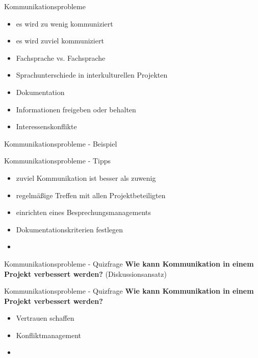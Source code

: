 \documentclass[12pt]{beamer}
\begin{document}
	\begin{frame}{Kommunikationsprobleme}
		\begin{itemize}
			\item{es wird zu wenig kommuniziert}
			\item{es wird zuviel kommuniziert}
			\item{Fachsprache vs. Fachsprache}
			\item{Sprachunterschiede in interkulturellen Projekten}
			\item{Dokumentation}
			\item{Informationen freigeben oder behalten}
			\item{Interessenskonflikte}
		\end{itemize}
	\end{frame}
	
	\begin{frame}{Kommunikationsprobleme - Beispiel}
		
	\end{frame}
	
	\begin{frame}{Kommunikationsprobleme - Tipps}
		\begin{itemize}
			\item{zuviel Kommunikation ist besser als zuwenig}
			\item{regelmäßige Treffen mit allen Projektbeteiligten}
			\item{einrichten eines Besprechungsmanagements}
			\item{Dokumentationskriterien festlegen}
			\item{}
		\end{itemize}
	\end{frame}

	\begin{frame}{Kommunikationsprobleme - Quizfrage}
		\textbf{Wie kann Kommunikation in einem Projekt verbessert werden?} (Diskussionsansatz)
	\end{frame}

	\begin{frame}{Kommunikationsprobleme - Quizfrage}
		\textbf{Wie kann Kommunikation in einem Projekt verbessert werden?} \\
		\begin{itemize}
			\item{Vertrauen schaffen}
			\item{Konfliktmanagement}
			\item{}
		\end{itemize}

	\end{frame}
\end{document}
